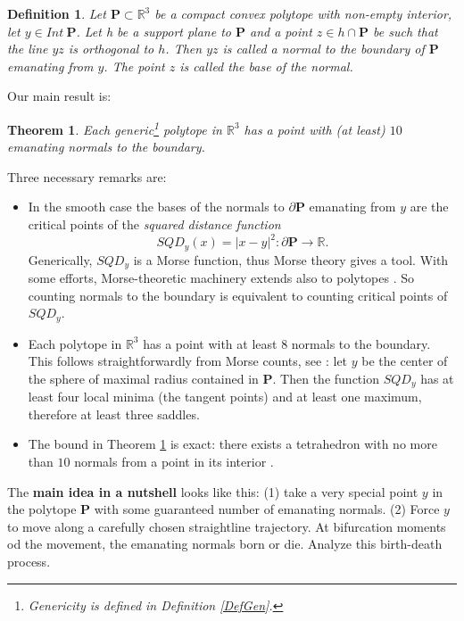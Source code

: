 \documentclass[12pt]{amsart}
\newtheorem{theorem}{Theorem}
\newtheorem*{main lemma}{The main lemma}
\newtheorem{definition}{Definition}
\begin{document}
\begin{definition}  Let $\mathbf{P}\subset \mathbb{R}^3$  be a compact convex polytope with non-empty interior, let $y\in Int~\mathbf{P}$. 
 Let h be a support plane to $\mathbf{P}$ and a point $z\in h\cap \mathbf{P}$  be such that the line $yz$ is orthogonal to $h$.
Then  $yz$ is called a \textit{normal to the boundary of $\mathbf{P}$ emanating from }$y$. The point $z$ is called the\textit{ base }of the normal.
\end{definition}

Our main result is:

\begin{theorem}\label{Thmmain}
  Each generic\footnote{Genericity is defined in Definition \ref{DefGen}.}  polytope in $\mathbb{R}^3$ has a point with (at least) $10$ emanating normals to the boundary.
\end{theorem}
 
 

 Three necessary remarks are:
 \begin{itemize}
   \item In the smooth case the bases of the normals to $\partial \mathbf{P}$ emanating from $y$ are  the critical points of the \textit{squared distance function } $$SQD_y(x)=|x-y|^2:\partial \mathbf{P}\rightarrow \mathbb{R}.$$ Generically,  $SQD_y$ is a Morse function, thus Morse theory gives a tool.
With some efforts, Morse-theoretic machinery  extends also to polytopes \cite{NasPanSiersma}.  So counting normals to the boundary is equivalent to counting critical points of $SQD_y$.
   \item Each polytope in $\mathbb{R}^3$ has a point with at least $8$ normals to the boundary. This follows  straightforwardly from Morse counts, see \cite{NasPanSiersma}: let $y$ be the center of the sphere of maximal radius contained in  $\mathbf{P}$. Then the function $SQD_y$ has at least four local minima (the tangent points) and at least one maximum, therefore at least three saddles.
   \item The bound in Theorem \ref{Thmmain} is exact: there exists a tetrahedron with no more than $10$ normals from a point in its interior \cite{NasPanSiersma}.
 \end{itemize}
 
 \medskip
 
 The \textbf{main idea in a nutshell} looks like this:  (1)  take a very special point $y$ in the polytope $\mathbf{P}$ with some guaranteed number of emanating normals. (2) Force $y$ to move along a carefully chosen straightline  trajectory. At bifurcation moments od the movement, the emanating normals  born or die. Analyze this birth-death process.  
 
\end{document}
